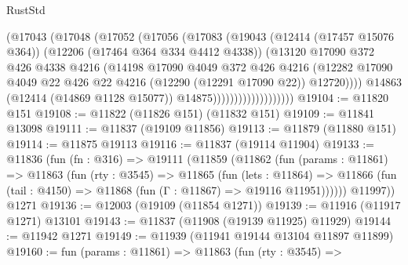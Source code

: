 \begin{lexlean}{RustStd}
\begin{coremodule}
                                (@17043
                                  (@17048
                                    (@17052
                                      (@17056
                                        (@17083
                                          (@19043
                                            (@12414 (@17457 @15076 @364))
                                            (@12206 (@17464 @364 @334 @4412 @4338))
                                            (@13120
                                              @17090
                                              @372
                                              @426
                                              @4338
                                              @4216
                                              (@14198
                                                @17090
                                                @4049
                                                @372
                                                @426
                                                @4216
                                                (@12282
                                                  @17090
                                                  @4049
                                                  @22
                                                  @426
                                                  @22
                                                  @4216
                                                  (@12290 (@12291 @17090 @22))
                                                  @12720))))
                                          @14863
                                          (@12414 (@14869 @1128 @15077))
                                          @14875)))))))))))))))))))
@19104 := @11820 @151
@19108 := @11822 (@11826 @151) (@11832 @151)
@19109 := @11841 @13098
@19111 := @11837 (@19109 @11856)
@19113 := @11879 (@11880 @151)
@19114 := @11875 @19113
@19116 := @11837 (@19114 @11904)
@19133 := @11836
    (fun (fn : @316) =>
    @19111
      (@11859
        (@11862
          (fun (params : @11861) =>
          @11863
            (fun (rty : @3545) =>
            @11865
              (fun (lets : @11864) =>
              @11866 (fun (tail : @4150) => @11868 (fun (Γ : @11867) => @19116 @11951))))))
        @11997))
    @1271
@19136 := @12003 (@19109 (@11854 @1271))
@19139 := @11916 (@11917 @1271) @13101
@19143 := @11837 (@11908 (@19139 @11925) @11929)
@19144 := @11942 @1271
@19149 := @11939 (@11941 @19144 @13104 @11897 @11899)
@19160 := fun (params : @11861) =>
  @11863
    (fun (rty : @3545) =>

\end{coremodule}
\end{lexlean}
